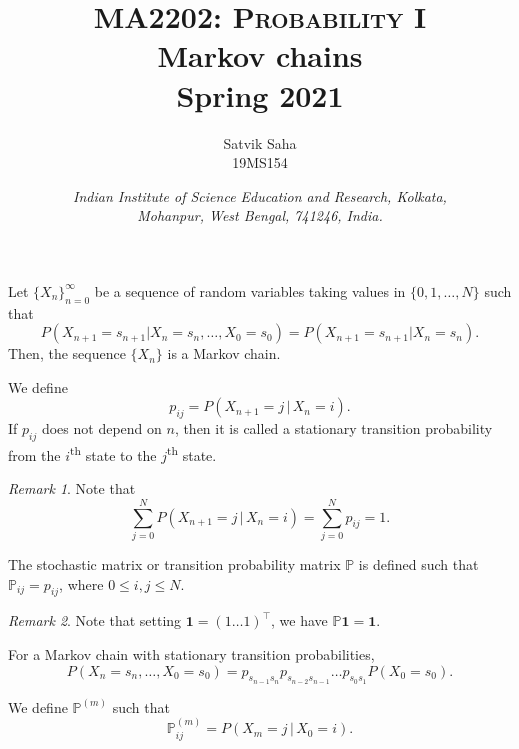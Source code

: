 \documentclass[11pt]{article}
\title{
    \Large\textsc{MA2202: Probability I} \\
    \Huge \textbf{Markov chains} \\
    \vspace{5pt}
    \Large{Spring 2021}
}
\author{
    \large Satvik Saha%
    \\\textsc{\small 19MS154}
}
\date{\normalsize
    \textit{Indian Institute of Science Education and Research, Kolkata, \\
    Mohanpur, West Bengal, 741246, India.} \\
}
\renewcommand\vec[1]{\boldsymbol{#1}}
\def\mP{\mathbb{P}}
\theoremstyle{definition}
\theoremstyle{remark}
\newtheorem*{remark}{Remark}
\numberwithin{equation}{module}
\begin{document}
    \maketitle

    \begin{definition}
        Let $\{X_n\}_{n = 0}^\infty$ be a sequence of random variables taking values
        in $\{0, 1, \dots, N\}$ such that \[
            P(X_{n + 1} = s_{n + 1} | X_{n} = s_n, \dots, X_0 = s_0) = P(X_{n + 1} =
            s_{n + 1} | X_n = s_n).
        \] Then, the sequence $\{X_n\}$ is a Markov chain.
    \end{definition}

    \begin{definition}
        We define \[
            p_{ij} = P(X_{n + 1} = j \,|\, X_n = i).
        \] If $p_{ij}$ does not depend on $n$, then it is called a stationary
        transition probability from the $i$\textsuperscript{th} state to the
        $j$\textsuperscript{th} state.
        \begin{remark}
            Note that \[
                \sum_{j = 0}^N P(X_{n + 1} = j \,|\, X_n = i) = \sum_{j = 0}^N
                p_{ij} = 1.
            \] 
        \end{remark}
    \end{definition}

    \begin{definition}
        The stochastic matrix or transition probability matrix $\mP$ is
        defined such that $\mP_{ij} = p_{ij}$, where $0 \leq i, j \leq N$.
        \begin{remark}
            Note that setting $\vec{1} = (1 \dots 1)^\top$, we have $\mP\vec{1} =
            \vec{1}$.
        \end{remark}
    \end{definition}

    \begin{lemma}
        For a Markov chain with stationary transition probabilities,
        \[
            P(X_n = s_n, \dots, X_0 = s_0) = p_{s_{n - 1}s_n}p_{s_{n - 2}s_{n -
            1}}\dots p_{s_0s_1}P(X_0 = s_0).
        \] 
    \end{lemma}

    \begin{definition}
        We define $\mP^{(m)}$ such that \[
            \mP^{(m)}_{ij} = P(X_m = j \,|\, X_0 = i).
        \] 
    \end{definition}
\end{document}

